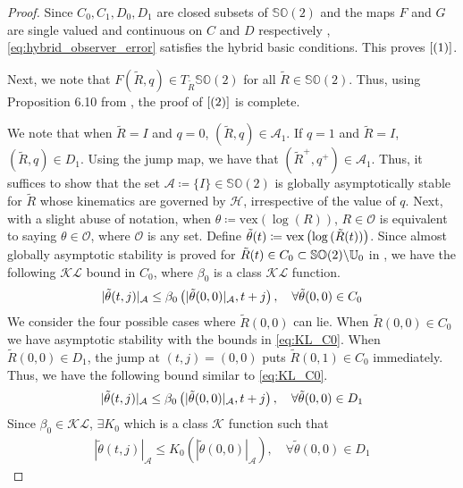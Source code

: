 \documentclass{article}
\newcommand{\SOtwo}{\mathbb{SO}(2)}
\newcommand{\vex}[1]{\text{vex}\left(#1\right)}
\newcommand{\brackets}[1]{\left(#1\right)}
\begin{document}
    \begin{proof}
         Since $C_0, C_1, D_0, D_1$ are closed subsets of $\SOtwo$ and the maps $F$ and $G$ are single valued and continuous on $C$ and $D$ respectively , \eqref{eq:hybrid_observer_error} satisfies the hybrid basic conditions. This proves $\eqref{(1)}$.
    
    Next, we note that $F(\tilde{R}, q)\in T_{\tilde{R}}\SOtwo$ for all $\tilde{R}\in \SOtwo$. Thus, using Proposition 6.10 from  \cite{hybridDynamicalSystems}, the proof of $\eqref{(2)}$ is complete. 
    
 We note that when $\tilde{R} = I$ and $q = 0$, $(\tilde{R}, q) \in \mathcal{A}_1$. If $q = 1$ and $\tilde{R} = I$, $(\tilde{R}, q) \in D_1$. Using the jump map, we have that $(\tilde{R}^+, q^+) \in\mathcal{A}_1$. Thus, it suffices to show that the set $\mathcal{A} \coloneqq
  \{I\} \in \SOtwo$ is globally asymptotically stable for $\tilde{R}$ whose kinematics are governed by $\mathcal{H}$, irrespective of the value of $q$.  Next, with a slight abuse of notation, when $\theta \coloneqq \vex{\log(R)}$, $R \in \mathcal{O}$ is equivalent to saying $\theta\in\mathcal{O}$, where $\mathcal{O}$ is any set. Define $\Tilde{\theta}(t) \coloneqq \vex{\log{(\Tilde{R}(t))}}$. 
  Since almost globally asymptotic stability is proved for $\Tilde{R}(t) \in C_0 \subset \SOtwo \backslash \mathbb{U}_0$  in \cite{mahony_complementaryFilter}, we have the following $\mathcal{KL}$ bound in $C_0$, where $\beta_0$ is a class $\mathcal{KL}$ function.
    \begin{align}\label{eq:KL_C0}
        |\Tilde{\theta}(t, j)|_\mathcal{A} \leq \beta_0\brackets{|\tilde{\theta}(0, 0)|_\mathcal{A}, t+j}, \quad \forall \tilde{\theta}(0, 0) \in C_0
    \end{align}
    We consider the four possible cases where $\tilde{R}(0, 0)$ can lie. When $\tilde{R}(0, 0)\in C_0$  we have asymptotic stability with the bounds in \eqref{eq:KL_C0}.
    When $\tilde{R}(0,0)\in D_1$, the jump at $(t,j) = (0,0)$ puts $\tilde{R}(0, 1) \in C_0$ immediately. Thus, we have the following bound similar to \eqref{eq:KL_C0}.
    \begin{align}\label{eq:KL_D1}
        |\Tilde{\theta}(t, j)|_\mathcal{A} \leq \beta_0\brackets{|\tilde{\theta}(0, 0)|_\mathcal{A}, t+j}, \quad \forall \tilde{\theta}(0, 0) \in D_1
    \end{align}
    Since $\beta_0\in \mathcal{KL}$, $\exists K_0$ which is a class $\mathcal{K}$ function such that 
    \begin{align}\label{eq:K_bound_D1}
        |\tilde\theta(t,j)|_\mathcal{A} \leq K_0(|\tilde\theta(0,0)|_\mathcal{A}), \quad \forall \tilde{\theta}(0,0) \in D_1
    \end{align}
    

\end{proof}
\end{document}
